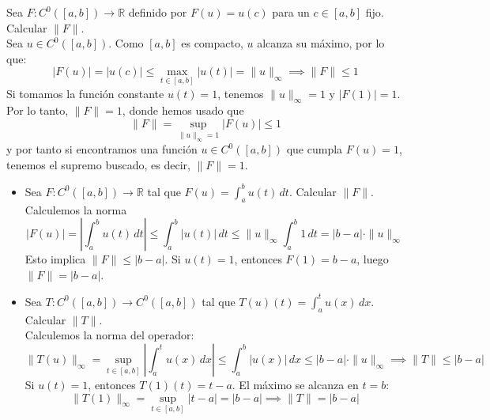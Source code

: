 \begin{ejercicio}
    Sea $F: C^0([a,b]) \to \mathbb{R}$ definido por $F(u) = u(c)$ para un $c \in [a,b]$ fijo. Calcular $\|F\|$. \\
    \noindent
    Sea $u \in C^0([a,b])$. Como $[a,b]$ es compacto, $u$ alcanza su máximo, por lo que:
    \[
    |F(u)| = |u(c)| \le \max_{t \in [a,b]} |u(t)| = \|u\|_\infty \implies \|F\| \le 1
    \]
    Si tomamos la función constante $u(t) = 1$, tenemos $\|u\|_\infty = 1$ y $|F(1)| = 1$. Por lo tanto, $\|F\| = 1$, donde hemos usado que 
    \begin{equation*}
        \|F\| = \sup_{\|u\|_\infty = 1} |F(u)| \leq 1
    \end{equation*}
    y por tanto si encontramos una función $u\in C^0([a,b])$ que cumpla $F(u)=1$, tenemos el supremo buscado, es decir, $\|F\|=1$.
\end{ejercicio}

\begin{ejercicio}
\begin{itemize}
    \item[(i)] Sea $F: C^0([a,b]) \to \mathbb{R}$ tal que $F(u) = \int_{a}^{b} u(t) \, dt$. Calcular $\|F\|$.\\
    Calculemos la norma
    \begin{equation*}
        |F(u)| = \left| \int_{a}^{b} u(t) \, dt \right| \le \int_{a}^{b} |u(t)| \, dt \le \|u\|_\infty \int_{a}^{b} 1 \, dt = |b-a| \cdot \|u\|_\infty
    \end{equation*}
    Esto implica $\|F\| \le |b-a|$. Si $u(t) = 1$, entonces $F(1) = b-a$, luego $\|F\| = |b-a|$.

    \item[(ii)] Sea $T: C^0([a,b]) \to C^0([a,b])$ tal que $T(u)(t) = \int_{a}^{t} u(x) \, dx$. Calcular $\|T\|$.\\
    Calculemos la norma del operador:
    \begin{equation*}
        \|T(u)\|_\infty = \sup_{t \in [a,b]} \left| \int_{a}^{t} u(x) \, dx \right| \le \int_{a}^{b} |u(x)| \, dx \le |b-a| \cdot \|u\|_\infty \implies \|T\| \le |b-a|
    \end{equation*}
    Si $u(t) = 1$, entonces $T(1)(t) = t-a$. El máximo se alcanza en $t=b$:
    \begin{equation*}
        \|T(1)\|_\infty = \sup_{t \in [a,b]} |t-a| = |b-a| \implies \|T\| = |b-a|
    \end{equation*}
\end{itemize}
\end{ejercicio}

